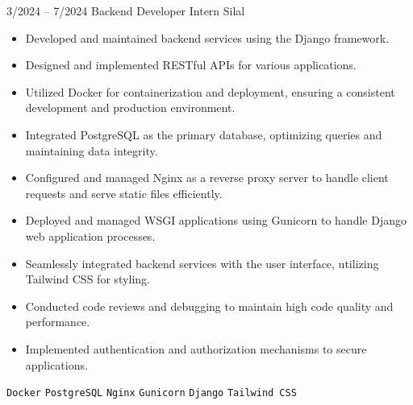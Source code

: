 \documentclass[9pt]{developercv} %
\begin{document}
\begin{entrylist}
    \entry
        {3/2024 -- 7/2024}
        {Backend Developer Intern}
        {Silal}
        {\vspace{-10pt}
        \begin{itemize}[noitemsep,topsep=0pt,parsep=0pt,partopsep=0pt, leftmargin=-1pt]
            \item Developed and maintained backend services using the Django framework.
            \item Designed and implemented RESTful APIs for various applications.
            \item Utilized Docker for containerization and deployment, ensuring a consistent development and production environment.
            \item Integrated PostgreSQL as the primary database, optimizing queries and maintaining data integrity.
            \item Configured and managed Nginx as a reverse proxy server to handle client requests and serve static files efficiently.
            \item Deployed and managed WSGI applications using Gunicorn to handle Django web application processes.
            \item Seamlessly integrated backend services with the user interface, utilizing Tailwind CSS for styling.
            \item Conducted code reviews and debugging to maintain high code quality and performance.
            \item Implemented authentication and authorization mechanisms to secure applications.
        \end{itemize} 
        \texttt{Docker} \slashsep \texttt{PostgreSQL} \slashsep \texttt{Nginx} \slashsep \texttt{Gunicorn} \slashsep \texttt{Django} \slashsep \texttt{Tailwind CSS}}
\end{entrylist}
\end{document}
